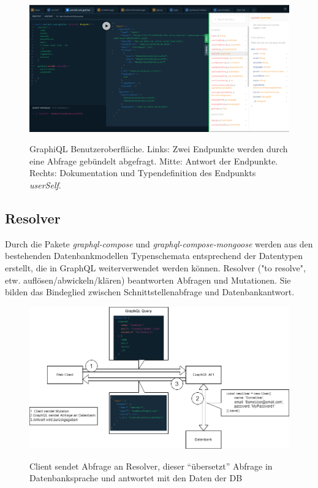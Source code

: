 \begin{figure}
	\centering
    \includegraphics[width=\textwidth]{sources/graphiql.png}\cite{}
	\caption{GraphiQL Benutzeroberfläche. Links: Zwei Endpunkte werden durch eine Abfrage gebündelt abgefragt. Mitte: Antwort der Endpunkte. Rechts: Dokumentation und Typendefinition des Endpunkts \textit{userSelf}.}
	\label{fig:gql:1}
\end{figure}

\subsection{Resolver}
Durch die Pakete \textit{graphql-compose} und \textit{graphql-compose-mongoose} werden aus den bestehenden Datenbankmodellen Typenschemata entsprechend der Datentypen erstellt, die in GraphQL weiterverwendet werden können. 
Resolver ("to resolve", etw. auflösen/abwickeln/klären) beantworten Abfragen und Mutationen.
Sie bilden das Bindeglied zwischen Schnittstellenabfrage und Datenbankantwort. \\

\begin{figure}
	\centering
    \includegraphics[width=\textwidth]{sources/GraphQL_Resolver_Schaubild.drawio}\cite{}
	\caption{Client sendet Abfrage an Resolver, dieser \enquote{übersetzt} Abfrage in Datenbanksprache und antwortet mit den Daten der DB}
	\label{fig:gql:resolver_schaubild}
\end{figure}

